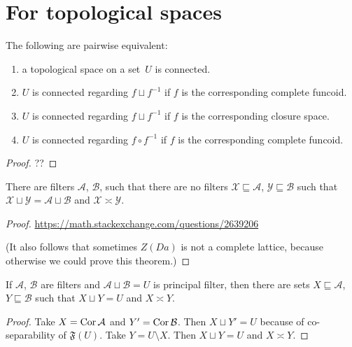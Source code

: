 \section{For topological spaces}

\begin{prop}
The following are pairwise equivalent:
\begin{enumerate}
 \item a topological space on a set~$U$ is connected.
 \item $U$ is connected regarding $f\sqcup f^{-1}$ if $f$ is the corresponding
   complete funcoid.
 \item $U$ is connected regarding $f\sqcup f^{-1}$ if $f$ is the corresponding
   closure space.
 \item $U$ is connected regarding $f\circ f^{-1}$ if $f$ is the corresponding
   complete funcoid.
\end{enumerate}
\end{prop}

\begin{proof}
??
\end{proof}

\begin{prop}
  There are filters $\mathcal{A}$, $\mathcal{B}$, such that there are no
  filters $\mathcal{X} \sqsubseteq \mathcal{A}$, $\mathcal{Y} \sqsubseteq
  \mathcal{B}$ such that $\mathcal{X} \sqcup \mathcal{Y} = \mathcal{A} \sqcup
  \mathcal{B}$ and $\mathcal{X} \asymp \mathcal{Y}$.
\end{prop}

\begin{proof}
  \url{https://math.stackexchange.com/questions/2639206}

  (It also follows that sometimes $Z (D a)$ is not a complete lattice, because
  otherwise we could prove this theorem.)
\end{proof}

\begin{prop}
  If $\mathcal{A}$, $\mathcal{B}$ are filters and $\mathcal{A} \sqcup
  \mathcal{B} = U$ is principal filter, then there are sets $X \sqsubseteq
  \mathcal{A}$, $Y \sqsubseteq \mathcal{B}$ such that $X \sqcup Y = U$ and $X
  \asymp Y$.
\end{prop}

\begin{proof}
  Take $X = \operatorname{Cor} \mathcal{A}$ and $Y' = \operatorname{Cor} \mathcal{B}$. Then $X
  \sqcup Y' = U$ because of co-separability of $\mathfrak{F} (U)$. Take $Y = U
  \setminus X$. Then $X \sqcup Y = U$ and $X \asymp Y$.
\end{proof}

